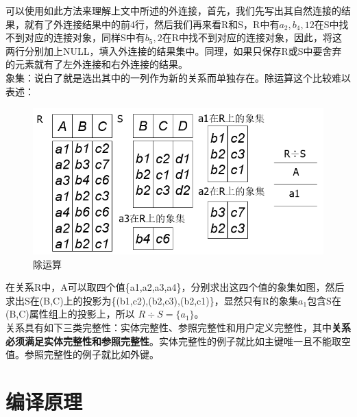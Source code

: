 \documentclass[main.tex]{subfiles}
\begin{document}
可以使用如此方法来理解上文中所述的外连接，首先，我们先写出其自然连接的结果，就有了外连接结果中的前4行，然后我们再来看R和S，R中有$ a_2,b_4,12 $在S中找不到对应的连接对象，同样S中有$ b_5,2 $在R中找不到对应的连接对象，因此，将这两行分别加上NULL，填入外连接的结果集中。同理，如果只保存R或S中要舍弃的元素就有了左外连接和右外连接的结果。\\
象集：说白了就是选出其中的一列作为新的关系而单独存在。除运算这个比较难以表述：\\
\begin{figure}[H]
    \centering
    \includegraphics[scale=0.25]{./images/0031.png}
    \caption{除运算}
\end{figure}
在关系R中，A可以取四个值\{a1,a2,a3,a4\}，分别求出这四个值的象集如图，然后求出S在(B,C)上的投影为\{(b1,c2),(b2,c3),(b2,c1)\}，显然只有R的象集$ a_1 $包含S在(B,C)属性组上的投影上，所以 $ R \div S=\{a_1\} $。\\
关系具有如下三类完整性：实体完整性、参照完整性和用户定义完整性，其中{\bfseries 关系必须满足实体完整性和参照完整性}。实体完整性的例子就比如主键唯一且不能取空值。参照完整性的例子就比如外键。

\section{编译原理}
\end{document}
